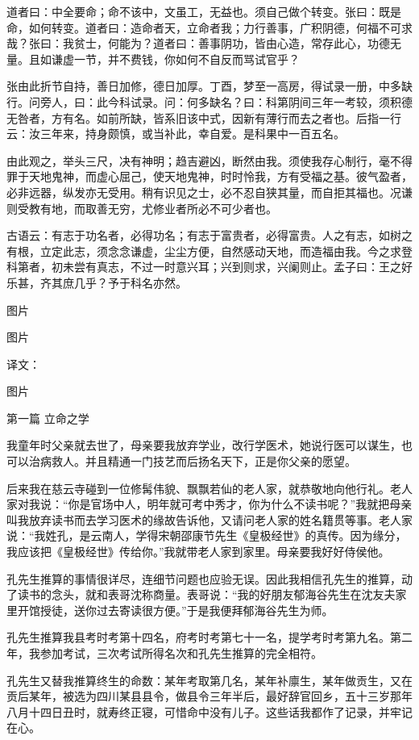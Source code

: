 \documentclass[12pt,UTF8]{ctexbook}
\begin{document}
道者曰：中全要命；命不该中，文虽工，无益也。须自己做个转变。张曰：既是命，如何转变。道者曰：造命者天，立命者我；力行善事，广积阴德，何福不可求哉？张曰：我贫士，何能为？道者曰：善事阴功，皆由心造，常存此心，功德无量。且如谦虚一节，并不费钱，你如何不自反而骂试官乎？

张由此折节自持，善日加修，德日加厚。丁酉，梦至一高房，得试录一册，中多缺行。问旁人，曰：此今科试录。问：何多缺名？曰：科第阴间三年一考较，须积德无咎者，方有名。如前所缺，皆系旧该中式，因新有薄行而去之者也。后指一行云：汝三年来，持身颇慎，或当补此，幸自爱。是科果中一百五名。

由此观之，举头三尺，决有神明；趋吉避凶，断然由我。须使我存心制行，毫不得罪于天地鬼神，而虚心屈己，使天地鬼神，时时怜我，方有受福之基。彼气盈者，必非远器，纵发亦无受用。稍有识见之士，必不忍自狭其量，而自拒其福也。况谦则受教有地，而取善无穷，尤修业者所必不可少者也。

古语云：有志于功名者，必得功名；有志于富贵者，必得富贵。人之有志，如树之有根，立定此志，须念念谦虚，尘尘方便，自然感动天地，而造福由我。今之求登科第者，初未尝有真志，不过一时意兴耳；兴到则求，兴阑则止。孟子曰：王之好乐甚，齐其庶几乎？予于科名亦然。


图片

图片

译文：

图片

第一篇 立命之学

我童年时父亲就去世了，母亲要我放弃学业，改行学医术，她说行医可以谋生，也可以治病救人。并且精通一门技艺而后扬名天下，正是你父亲的愿望。

后来我在慈云寺碰到一位修髯伟貌、飘飘若仙的老人家，就恭敬地向他行礼。老人家对我说：“你是官场中人，明年就可考中秀才，你为什么不读书呢？”我就把母亲叫我放弃读书而去学习医术的缘故告诉他，又请问老人家的姓名籍贯等事。老人家说：“我姓孔，是云南人，学得宋朝邵康节先生《皇极经世》的真传。因为缘分，我应该把《皇极经世》传给你。”我就带老人家到家里。母亲要我好好侍侯他。

孔先生推算的事情很详尽，连细节问题也应验无误。因此我相信孔先生的推算，动了读书的念头，就和表哥沈称商量。表哥说：“我的好朋友郁海谷先生在沈友夫家里开馆授徒，送你过去寄读很方便。”于是我便拜郁海谷先生为师。

孔先生推算我县考时考第十四名，府考时考第七十一名，提学考时考第九名。第二年，我参加考试，三次考试所得名次和孔先生推算的完全相符。

孔先生又替我推算终生的命数：某年考取第几名，某年补廪生，某年做贡生，又在贡后某年，被选为四川某县县令，做县令三年半后，最好辞官回乡，五十三岁那年八月十四日丑时，就寿终正寝，可惜命中没有儿子。这些话我都作了记录，并牢记在心。
\end{document}
